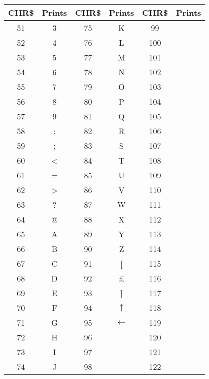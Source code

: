 \newpage



\begin{center}
\begin{longtable}{ c c | c c  | c c}
	\textbf{CHR\$} & \textbf{Prints} & \textbf{CHR\$} & \textbf{Prints} & \textbf{CHR\$} & \textbf{Prints}\\
  \hline
	\endhead

	51	&	3		&	75	&	K					&	99	& \graphicsymbol{C}\\
	52	&	4		&	76	&	L					&	100	& \graphicsymbol{D}\\
	53	&	5		&	77	&	M					&	101	& \graphicsymbol{E}\\
	54	&	6		&	78	&	N					&	102	& \graphicsymbol{F}\\
	55	&	7		&	79	&	O					&	103	& \graphicsymbol{G}\\
	56	&	8		&	80	& P						&	104	& \graphicsymbol{H}\\
	57	&	9		&	81	& Q						&	105	& \graphicsymbol{I}\\
	58	&	:		&	82	& R						&	106	& \graphicsymbol{J}\\
	59	&	;		&	83	& S						&	107	& \graphicsymbol{K}\\
	60	&	<		&	84	& T						&	108	& \graphicsymbol{L}\\
	61	&	=		&	85	& U						&	109	& \graphicsymbol{M}\\
	62	&	>		&	86	& V						&	110	& \graphicsymbol{N}\\
	63	&	?		&	87	& W						&	111	& \graphicsymbol{O}\\
	64	&	@		&	88	& X						&	112	& \graphicsymbol{P}\\
	65	&	A		&	89	& Y						&	113	& \graphicsymbol{Q}\\
	66	&	B		&	90	& Z						&	114	& \graphicsymbol{R}\\
	67	&	C		&	91	& [						&	115	& \graphicsymbol{S}\\
	68	&	D		&	92	& \pounds				&	116	& \graphicsymbol{T}\\
	69	&	E		&	93	& ]						&	117	& \graphicsymbol{U}\\
	70	&	F		&	94	& $\uparrow$			&	118	& \graphicsymbol{V}\\
	71	&	G		&	95	& $\leftarrow$			&	119	& \graphicsymbol{W}\\
	72	&	H		&	96	& \graphicsymbol{C}		&	120	& \graphicsymbol{X}\\
	73	&	I		&	97	& \graphicsymbol{A}		&	121	& \graphicsymbol{Y}\\
	74	&	J		&	98	& \graphicsymbol{B}		&	122	& \graphicsymbol{Z}\\

\end{longtable}
\end{center}



